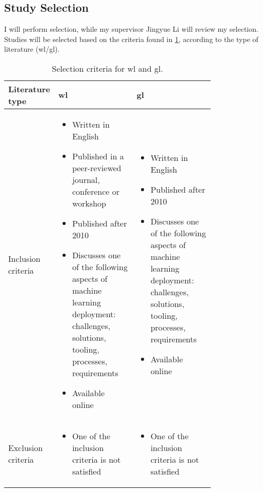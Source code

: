 \subsection{Study Selection}
I will perform selection, while my supervisor Jingyue Li will review my selection.
Studies will be selected based on the criteria found in \cref{tab:selection_criteria}, according to the type of literature (\acrshort{wl}/\acrshort{gl}).
\begin{table}[h]
    \centering
    \begin{tabular}{l|p{0.4\linewidth}|p{0.4\linewidth}}
         Literature type & \acrshort{wl} & \acrshort{gl}  \\
         \hline
        Inclusion criteria & \begin{itemize}
    \item Written in English
    \item Published in a peer-reviewed journal, conference or workshop
    \item Published after 2010
    \item Discusses one of the following aspects of machine learning deployment: challenges, solutions, tooling, processes, requirements
    \item Available online
\end{itemize} & \begin{itemize}
    \item Written in English
    \item Published after 2010
    \item Discusses one of the following aspects of machine learning deployment: challenges, solutions, tooling, processes, requirements
    \item Available online
\end{itemize} \\
         Exclusion criteria & \begin{itemize}
             \item One of the inclusion criteria is not satisfied
         \end{itemize}  & \begin{itemize}
             \item One of the inclusion criteria is not satisfied
         \end{itemize} \\
    \end{tabular}
    \caption{Selection criteria for \acrfull{wl} and \acrfull{gl}.}
    \label{tab:selection_criteria}
\end{table}

